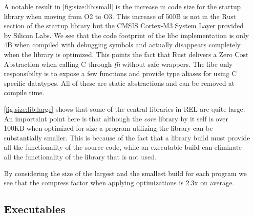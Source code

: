 A notable result in \autoref{fig:size:lib:small} is the increase in code size for the startup library when moving from O2 to O3.
This increase of 500B is not in the Rust section of the startup library but the CMSIS Cortex-M3 System Layer provided by Silicon Labs.
We see that the code footprint of the libc implementation is only 4B when compiled with debugging symbols and actually disappears completely when the library is optimized.
This points the fact that Rust delivers a Zero Cost Abstraction when calling C through \emph{ffi} without safe wrappers.
The libc only responsibilty is to expose a few functions and provide type aliases for using C specific datatypes.
All of these are static abstractions and can be removed at compile time.

\autoref{fig:size:lib:large} shows that some of the central libraries in REL are quite large.
An importaint point here is that although the \emph{core} library by it self is over 100KB when optimized for size a program utilizing the library can be substantially smaller.
This is because of the fact that a library build must provide all the functionality of the source code, while an executable build can eliminate all the functionality of the library that is not used.

By considering the size of the largest and the smallest build for each program we see that the compress factor when applying optimizations is 2.3x on average.

\subsection{Executables}
